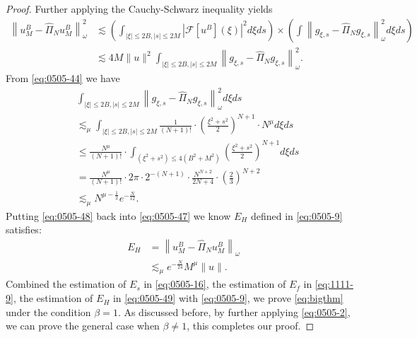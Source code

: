 \documentclass[10pt,a4paper]{amsart}
\begin{document}
\begin{proof}
  Further applying the Cauchy-Schwarz inequality yields
  \begin{equation}\label{eq:0505-47}
    \begin{aligned}
    \left\|u_M^B-\widehat{\Pi}_N u_M^B\right\|_\omega^2 & \lesssim\left(\int_{|\xi| \leqslant 2 B,|s| \leqslant 2 M}\left|\mathcal{F}\left[u^B\right](\xi)\right|^2 d \xi d s\right) 
    \times\left(\int\left\|g_{\xi, s}-\widehat{\Pi}_N g_{\xi, s}\right\|_\omega^2 d \xi d s\right) \\
    & \lesssim 4 M\|u\|^2 \int_{|\xi| \leqslant 2 B,|s| \leqslant 2 M}\left\|g_{\xi, s}-\widehat{\Pi}_N g_{\xi, s}\right\|_\omega^2.
    \end{aligned}
  \end{equation}
  From \eqref{eq:0505-44} we have
  \begin{equation}\label{eq:0505-48}
    \begin{aligned}
    & \int_{|\xi| \leqslant 2 B,|s| \leqslant 2 M}\left\|g_{\xi, s}-\widehat{\Pi}_N g_{\xi, s}\right\|_\omega^2 d \xi d s \\
    &\lesssim_\mu \int_{|\xi| \leqslant 2 B,|s| \leqslant 2 M} \frac{1}{(N+1)!} \cdot\left(\frac{\xi^2+s^2}{2}\right)^{N+1} \cdot N^\mu d \xi d s \\
    & \leqslant \frac{N^\mu}{(N+1)!} \cdot \int_{\left(\xi^2+s^2\right) \leqslant 4\left(B^2+M^2\right)}\left(\frac{\xi^2+s^2}{2}\right)^{N+1} d \xi d s \\
    &= \frac{N^\mu}{(N+1)!} \cdot 2 \pi \cdot 2^{-(N+1)} \cdot \frac{N^{N+2}}{2 N+4} \cdot\left(\frac{2}{3}\right)^{N+2} \\
    &\lesssim_\mu N^{\mu-\frac{1}{2}} e^{-\frac{N}{12}}.
    \end{aligned}
  \end{equation}
  Putting \eqref{eq:0505-48} back into \eqref{eq:0505-47} we know
  $E_H$ defined in \eqref{eq:0505-9} satisfies:
  \begin{equation}\label{eq:0505-49}
    \begin{aligned}
    E_H&=\left\|u_M^B-\widehat{\Pi}_N u_M^B\right\|_\omega \\
    &\lesssim_\mu e^{-\frac{N}{24}} M^\mu \|u\|.
    \end{aligned}
  \end{equation}
  Combined the estimation of $E_s$ in \eqref{eq:0505-16}, the estimation
  of $E_f$ in \eqref{eq:1111-9}, the estimation of $E_H$ in \eqref{eq:0505-49}
  with \eqref{eq:0505-9}, we prove \eqref{eq:bigthm} under the condition $\beta = 1$.
  As discussed before, by further applying \eqref{eq:0505-2}, we can prove the general
  case when $\beta \neq 1$, this completes our proof.
\end{proof}
\end{document}
